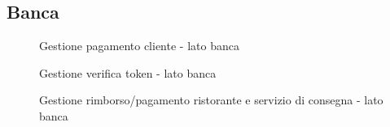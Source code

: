\documentclass[11pt]{article} %
\begin{document}
\subsection{Banca}
\label{bpmn:bank}

\begin{figure}[H]
\begin{center}
\caption{Gestione pagamento cliente - lato banca}
\end{center}
\end{figure}

\begin{figure}[H]
\begin{center}
\caption{Gestione verifica token - lato banca}
\end{center}
\end{figure}

\begin{figure}[H]
\begin{center}
\caption{Gestione rimborso/pagamento ristorante e servizio di consegna - lato banca}
\end{center}
\end{figure}
\end{document}
